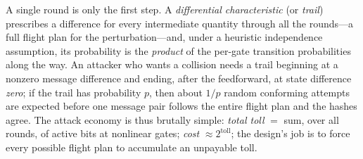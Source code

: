 A single round is only the first step. A \emph{differential
characteristic} (or \emph{trail}) prescribes a difference for every
intermediate quantity through all the rounds---a full flight plan for
the perturbation---and, under a heuristic independence assumption, its
probability is the \emph{product} of the per-gate transition
probabilities along the way. An attacker who wants a collision needs a
trail beginning at a nonzero message difference and ending, after the
feedforward, at state difference \emph{zero}; if the trail has
probability $p$, then about $1/p$ random conforming attempts are
expected before one message pair follows the entire flight plan and the
hashes agree. The attack economy is thus brutally simple: \emph{total
toll} $=$ sum, over all rounds, of active bits at nonlinear gates;
\emph{cost} $\approx 2^{\text{toll}}$; the design's job is to force
every possible flight plan to accumulate an unpayable toll.

